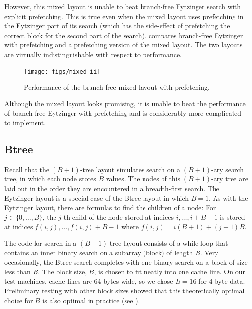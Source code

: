 \documentclass{patmorin}
\begin{document}
However, this mixed layout is unable to beat branch-free Eytzinger
search with explicit prefetching. This is true even when the mixed
layout uses prefetching in the Eytzinger part of its search (which has
the side-effect of prefetching the correct block for the second part
of the search).  compares branch-free Eytzinger with
prefetching and a prefetching version of the mixed layout.  The two
layouts are virtually indistinguishable with respect to performance.

\begin{figure}
   \begin{center}
     \texttt{[image: figs/mixed-ii]}
   \end{center}
   \caption{Performance of the branch-free mixed layout with prefetching.}
\end{figure}

\begin{lesson}
  Although the mixed layout looks promising, it is unable to beat
  the performance of branch-free Eytzinger with prefetching and is
  considerably more complicated to implement.
\end{lesson}

\subsection{Btree}

Recall that the $(B+1)$-tree layout simulates search on a $(B+1)$-ary
search tree, in which each node stores $B$ values.  The nodes of this
$(B+1)$-ary tree are laid out in the order they are encountered in
a breadth-first search.  The Eytzinger layout is a special
case of the Btree layout in which $B=1$. As with the Eytzinger layout, there
are formulas to find the children of a node: For $j\in\{0,\ldots,B\}$, the
$j$-th child of the node stored at indices $i,\ldots,i+B-1$ is stored
at indices $f(i,j),\ldots,f(i,j)+B-1$ where $f(i,j)=i(B+1)+(j+1)B$.

The code for search in a $(B+1)$-tree layout consists of a while loop
that contains an inner binary search on a subarray (block) of length
$B$. Very occasionally, the Btree search completes with one binary search
on a block of size less than $B$. The block size, $B$, is chosen to fit
neatly into one cache line. On our test machines, cache lines are 64
bytes wide, so we chose $B=16$ for 4-byte data. Preliminary testing with
other block sizes showed that this theoretically optimal choice for $B$
is also optimal in practice (see ).
\end{document}
